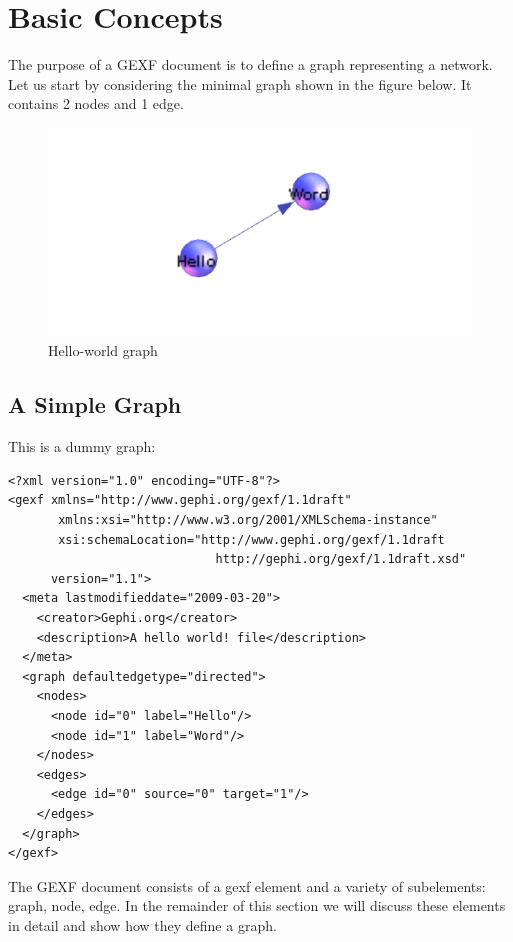 \documentclass[a4paper,10pt]{article}
\begin{document}
\section{Basic Concepts} \label{basic}

The purpose of a GEXF document is to define a graph representing a network. Let us start by considering the minimal graph shown in the figure below. It contains 2 nodes and 1 edge.

\begin{figure}[!ht]
  \begin{center}
  \includegraphics[scale=0.5]{res/simple.png}
  \caption{Hello-world graph}
  \end{center}
\end{figure}

\subsection{A Simple Graph}

This is a dummy graph:

\lstset{ style=gexf }
\begin{lstlisting}[caption={Hello world!},label=helloworld]
<?xml version="1.0" encoding="UTF-8"?>
<gexf xmlns="http://www.gephi.org/gexf/1.1draft"
       xmlns:xsi="http://www.w3.org/2001/XMLSchema-instance"
       xsi:schemaLocation="http://www.gephi.org/gexf/1.1draft
                             http://gephi.org/gexf/1.1draft.xsd"
      version="1.1">
  <meta lastmodifieddate="2009-03-20">
    <creator>Gephi.org</creator>
    <description>A hello world! file</description>
  </meta>
  <graph defaultedgetype="directed">
    <nodes>
      <node id="0" label="Hello"/>
      <node id="1" label="Word"/>
    </nodes>
    <edges>
      <edge id="0" source="0" target="1"/>
    </edges>
  </graph>
</gexf>
\end{lstlisting}

The GEXF document consists of a gexf element and a variety of subelements: graph, node, edge. In the remainder of this section we will discuss these elements in detail and show how they define a graph.
\end{document}
